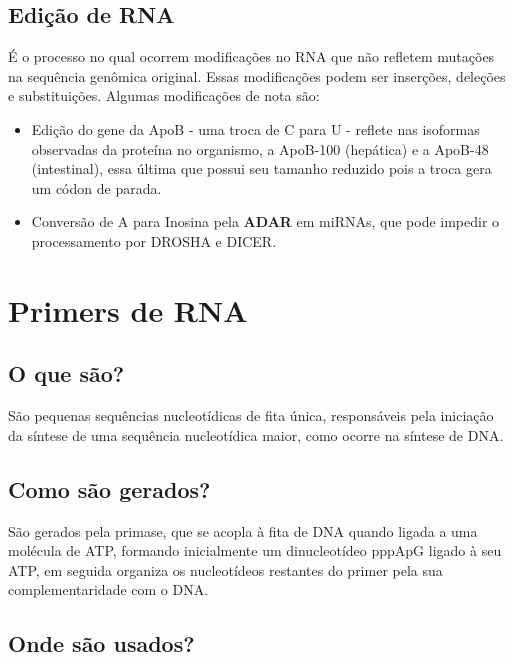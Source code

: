 \documentclass[
]{book}
\begin{document}
\hypertarget{ediuxe7uxe3o-de-rna}{%
\section{Edição de RNA}\label{ediuxe7uxe3o-de-rna}}

É o processo no qual ocorrem modificações no RNA que não refletem mutações na sequência genômica original. Essas modificações podem ser inserções, deleções e substituições. Algumas modificações de nota são:

\begin{itemize}
\item
  Edição do gene da ApoB - uma troca de C para U - reflete nas isoformas observadas da proteína no organismo, a ApoB-100 (hepática) e a ApoB-48 (intestinal), essa última que possui seu tamanho reduzido pois a troca gera um códon de parada.
\item
  Conversão de A para Inosina pela \textbf{ADAR} em miRNAs, que pode impedir o processamento por DROSHA e DICER.
\end{itemize}

\hypertarget{primers-de-rna}{%
\chapter{Primers de RNA}\label{primers-de-rna}}

\hypertarget{o-que-suxe3o}{%
\section{O que são?}\label{o-que-suxe3o}}

São pequenas sequências nucleotídicas de fita única, responsáveis pela iniciação da síntese de uma sequência nucleotídica maior,
como ocorre na síntese de DNA.

\hypertarget{como-suxe3o-gerados}{%
\section{Como são gerados?}\label{como-suxe3o-gerados}}

São gerados pela primase, que se acopla à fita de DNA quando ligada a uma molécula de ATP, formando inicialmente um dinucleotídeo pppApG ligado à seu ATP, em seguida organiza os nucleotídeos restantes do primer pela sua complementaridade com o DNA.

\hypertarget{onde-suxe3o-usados}{%
\section{Onde são usados?}\label{onde-suxe3o-usados}}
\end{document}
